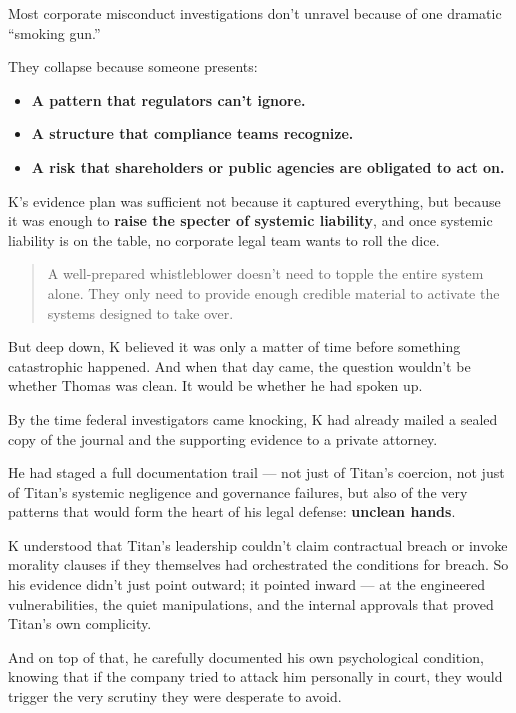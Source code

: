 Most corporate misconduct investigations don’t unravel because of one dramatic “smoking gun.”

They collapse because someone presents:

\begin{itemize}
    \item \textbf{A pattern that regulators can’t ignore.}
    \item \textbf{A structure that compliance teams recognize.}
    \item \textbf{A risk that shareholders or public agencies are obligated to act on.}
\end{itemize}

\medskip

K’s evidence plan was sufficient not because it captured everything,  
but because it was enough to \textbf{raise the specter of systemic liability},  
and once systemic liability is on the table, no corporate legal team wants to roll the dice.

\begin{quote}
    A well-prepared whistleblower doesn’t need to topple the entire system alone.  
    They only need to provide enough credible material to activate the systems designed to take over.
\end{quote}


But deep down, K believed it was only a matter of time before something catastrophic happened.
And when that day came, the question wouldn’t be whether Thomas was clean.
It would be whether he had spoken up.

By the time federal investigators came knocking,
K had already mailed a sealed copy of the journal and the supporting evidence to a private attorney.

He had staged a full documentation trail —
not just of Titan’s coercion,
not just of Titan’s systemic negligence and governance failures,
but also of the very patterns that would form the heart of his legal defense:
\textbf{unclean hands}.

K understood that Titan’s leadership couldn’t claim contractual breach or invoke morality clauses if they themselves had orchestrated the conditions for breach.
So his evidence didn’t just point outward;
it pointed inward —
at the engineered vulnerabilities, the quiet manipulations, and the internal approvals that proved Titan’s own complicity.

And on top of that,
he carefully documented his own psychological condition,
knowing that if the company tried to attack him personally in court,
they would trigger the very scrutiny they were desperate to avoid.

